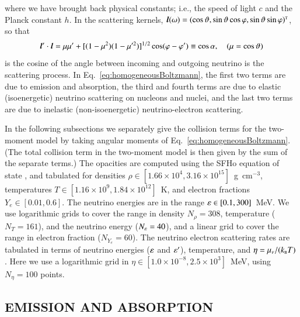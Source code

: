 \documentclass[11pt,letterpaper,twoside,english,final]{article}
\begin{document}
where we have brought back physical constants; i.e., the speed of light $c$ and the Planck constant $h$.  
In the scattering kernels, $\boldsymbol{l}(\omega)=(\cos\vartheta,\sin\vartheta\cos\varphi,\sin\vartheta\sin\varphi)^{\mbox{\tiny T}}$, so that
\begin{equation}
 \boldsymbol{l}'\cdot\boldsymbol{l}  = \mu\mu' + [(1-\mu^2)(1-\mu'^{2})]^{1/2}\cos(\varphi-\varphi')
 \equiv \cos\alpha,
 \quad(\mu=\cos\vartheta)
\end{equation}
is the cosine of the angle between incoming and outgoing neutrino is the scattering process.  
In Eq.~\eqref{eq:homogeneousBoltzmann}, the first two terms are due to emission and absorption, the third and fourth terms are due to elastic (isoenergetic) neutrino scattering on nucleons and nuclei, and the last two terms are due to inelastic (non-isoenergetic) neutrino-electron scattering.  

In the following subsections we separately give the collision terms for the two-moment model by taking angular moments of Eq.~\eqref{eq:homogeneousBoltzmann}.  
(The total collision term in the two-moment model is then given by the sum of the separate terms.)  
The opacities are computed using the SFHo equation of state \citep{steiner_etal_2013}, and tabulated for densities $\rho\in[1.66\times10^{4},3.16\times10^{15}]$~g~cm$^{-3}$, temperatures $T\in[1.16\times10^{9},1.84\times10^{12}]$~K, and electron fractions $Y_{e}\in[0.01,0.6]$.  
The neutrino energies are in the range $\varepsilon\in[0.1,300]$~MeV.  
We use logarithmic grids to cover the range in density $N_{\rho}=308$, temperature ($N_{T}=161$), and the neutrino energy ($N_{\varepsilon}=40$), and a linear grid to cover the range in electron fraction ($N_{Y_{e}}=60$).  
The neutrino electron scattering rates are tabulated in terms of neutrino energies ($\varepsilon$ and $\varepsilon'$), temperature, and $\eta=\mu_{\nu}/(k_{\mbox{\tiny B}}T)$.  
Here we use a logarithmic grid in $\eta\in[1.0\times10^{-8},2.5\times10^{3}]$~MeV, using $N_{\eta}=100$ points.  

\subsection{EMISSION AND ABSORPTION}
\label{sec:electronCapture}
\end{document}
